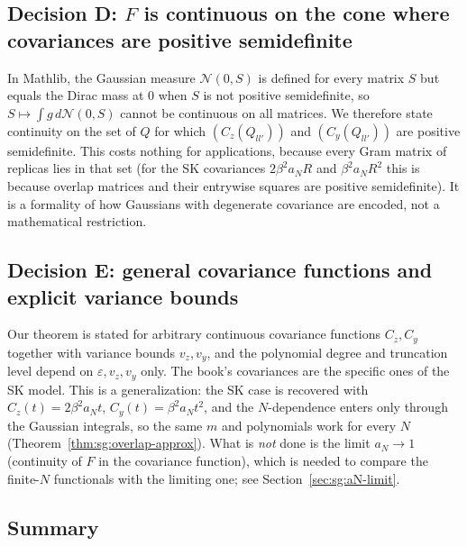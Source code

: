 \subsection*{Decision D: $F$ is continuous on the cone where covariances are positive semidefinite}

In Mathlib, the Gaussian measure $\mathcal N(0,S)$ is defined for every matrix $S$ but equals the Dirac mass at $0$ when $S$ is not positive semidefinite, so $S\mapsto\int g\,d\mathcal N(0,S)$ cannot be continuous on all matrices.
We therefore state continuity on the set of $Q$ for which $(C_z(Q_{ll'}))$ and $(C_y(Q_{ll'}))$ are positive semidefinite. This costs nothing for applications, because every Gram matrix of replicas lies in that set
(for the SK covariances $2\beta^2a_NR$ and $\beta^2a_NR^2$ this is because overlap matrices and their entrywise squares are positive semidefinite). It is a formality of how Gaussians with degenerate covariance are encoded, not a mathematical restriction.

\subsection*{Decision E: general covariance functions and explicit variance bounds}

Our theorem is stated for arbitrary continuous covariance functions $C_z,C_y$ together with variance bounds $v_z,v_y$, and the polynomial degree and truncation level depend on $\varepsilon,v_z,v_y$ only. The book's covariances are the specific ones of the SK model.
This is a generalization: the SK case is recovered with $C_z(t)=2\beta^2a_Nt$, $C_y(t)=\beta^2a_Nt^2$, and the $N$-dependence enters only through the Gaussian integrals, so the same $m$ and polynomials work for every $N$ (Theorem~\ref{thm:sg:overlap-approx}).
What is \emph{not} done is the limit $a_N\to1$ (continuity of $F$ in the covariance function), which is needed to compare the finite-$N$ functionals with the limiting one; see Section~\ref{sec:sg:aN-limit}.

\subsection*{Summary}

